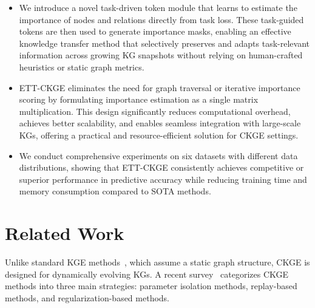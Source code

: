 \documentclass[runningheads]{llncs}
\begin{document}
\begin{itemize}
    \item We introduce a novel task-driven token module that learns to estimate the importance of nodes and relations directly from task loss. These task-guided tokens are then used to generate importance masks, enabling an effective knowledge transfer method that selectively preserves and adapts task-relevant information across growing KG snapshots without relying on human-crafted heuristics or static graph metrics.
    \item ETT-CKGE eliminates the need for graph traversal or iterative importance scoring by formulating importance estimation as a single matrix multiplication. This design significantly reduces computational overhead, achieves better scalability, and enables seamless integration with large-scale KGs, offering a practical and resource-efficient solution for CKGE settings.
    \item We conduct comprehensive experiments on six datasets with different data distributions, showing that ETT-CKGE consistently achieves competitive or superior performance in predictive accuracy while reducing training time and memory consumption compared to SOTA methods.
\end{itemize}




\section{Related Work}
 

Unlike standard KGE methods~\cite{bordes2013translating,trouillon2016complex,kazemi2018simple,wang2019logic}, which assume a static graph structure, CKGE is designed for dynamically evolving KGs. A recent survey~\cite{zhang2024continual} categorizes CKGE methods into three main strategies: parameter isolation methods, replay-based methods, and regularization-based methods.  
\end{document}
